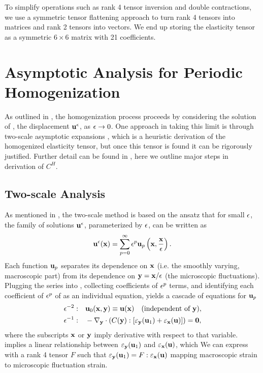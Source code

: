 \documentclass[twocolumn,10pt]{article}
\begin{document}
To simplify operations such as rank 4 tensor inversion and double
contractions, we use a symmetric tensor flattening approach to turn
rank 4 tensors into matrices and rank 2 tensors into vectors. We end
up storing the elasticity tensor as a symmetric $6\times 6$ matrix
with 21 coefficients. 

\appendix
\section{Asymptotic Analysis for Periodic Homogenization\label{apx:asymptotic}}
As outlined in , the homogenization process proceeds
by considering the solution of , the displacement
$\mathbf u^\epsilon$, as $\epsilon\to 0$. One approach in taking this limit is through
two-scale asymptotic expansions \cite{allaire2002shape}, which is a
heuristic derivation of the homogenized elasticity tensor, but once
this tensor is found it can be rigorously justified. Further detail
can be found in \cite{allaire2002shape}, here we outline major steps
in derivation of $C^H$.

\subsection{Two-scale Analysis}
As mentioned in , the two-scale method is based on the
ansatz that for small $\epsilon$, the family of solutions $\mathbf u^\epsilon$,
parameterized by $\epsilon$, can be written as
\begin{equation}
  \mathbf u^\epsilon(\mathbf x) = \sum_{p = 0}^{\infty} \epsilon^p \mathbf u_p\left(\mathbf x, \frac{\mathbf x}{\epsilon}\right).
\end{equation}
Each function $\mathbf u_p$ separates its dependence on $\mathbf x$ (i.e. the
smoothly varying, macroscopic part) from its dependence on $\mathbf y =
\mathbf x/\epsilon$ (the microscopic fluctuations). Plugging the series into
, collecting coefficients of $\epsilon^p$ terms, and
identifying each coefficient of $\epsilon^p$ of as an individual equation,
yields a cascade of equations for $\mathbf u_p$
\begin{align}
  \epsilon^{-2}:\quad  & \mathbf u_0(\mathbf x,\mathbf y) \equiv \mathbf u(\mathbf x) \quad\text{(independent of $\mathbf y$)}, \label{eqn:em2}\\
  \epsilon^{-1}:\quad  & -\nabla_{\mathbf y} \cdot (C(\mathbf y) : [\varepsilon_{\mathbf y}(\mathbf u_1) + \varepsilon_{\mathbf x}(\mathbf u)]) =  \mathbf 0,  \label{eqn:em1}
\end{align}
where the subscripts $\mathbf x$ or $\mathbf y$ imply derivative with respect to
that variable.  implies a linear relationship between
$\varepsilon_{\mathbf y}(\mathbf u_1)$ and $\varepsilon_{\mathbf x}(\mathbf u)$, which We can express with a
rank 4 tensor $F$ such that $\varepsilon_{\mathbf y}(\mathbf u_1) = F:\varepsilon_{\mathbf x}(\mathbf u)$
mapping macroscopic strain to microscopic fluctuation strain.
\end{document}
